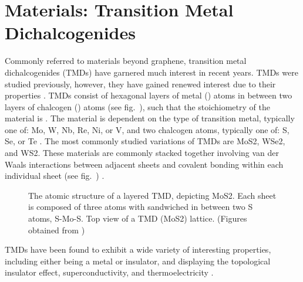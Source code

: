\section{\Td Materials: Transition Metal Dichalcogenides}\label{sec:tmds}
Commonly referred to \td materials beyond graphene, transition metal dichalcogenides (TMDs) have garnered much interest in recent years. \acp{TMD} were studied previously, however, they have gained renewed interest due to their properties \cite{Frindt_Royal1963,Fivaz_PhysRev1967,Mattheiss_PhysRevB1973,Wilson_AdvPhys1969}. \acp{TMD} consist of hexagonal layers of metal () atoms in between two layers of chalcogen () atoms (see fig.~), such that the stoichiometry of the material is  \cite{Xu_ChemRev2013}. The material is dependent on the type of transition metal, typically one of: \ac{Mo}, \ac{W}, \ac{Nb}, \ac{Re}, \ac{Ni}, or \ac{V}, and two chalcogen atoms, typically one of: \ac{S}, \ac{Se}, or \ac{Te} \cite{Wilson_AdvPhys1969,Wells_Oxford1984}. The most commonly studied variations of \acp{TMD} are \ac{MoS2}, \ac{WSe2}, and \ac{WS2}. These materials are commonly stacked together involving van der Waals interactions between adjacent sheets and covalent bonding within each individual sheet (see fig.~) \cite{Xu_ChemRev2013}.
\begin{figure}[ht]
	\centering
	\qquad
	\caption[Hexagonal lattice structure of \acs{TMD}]{\protect{} The atomic structure of a layered \acs{TMD}, depicting \acs{MoS2}. Each sheet is composed of three atoms with  sandwiched in between two \acs{S} atoms, \acs{S}-\acs{Mo}-\acs{S}. \protect{} Top view of a \acs{TMD} (\acs{MoS2}) lattice. (Figures obtained from \cite{Kis_NatureNano2011})}
\end{figure}
\noindent \acp{TMD} have been found to exhibit a wide variety of interesting properties, including either being a metal or insulator, and displaying the topological insulator effect, superconductivity, and thermoelectricity \cite{Lang_ACSnano2012,Zhang_AdvMat2012,Xie_AppPhysLett2009,Gamble_JournChemPhys1975}.

